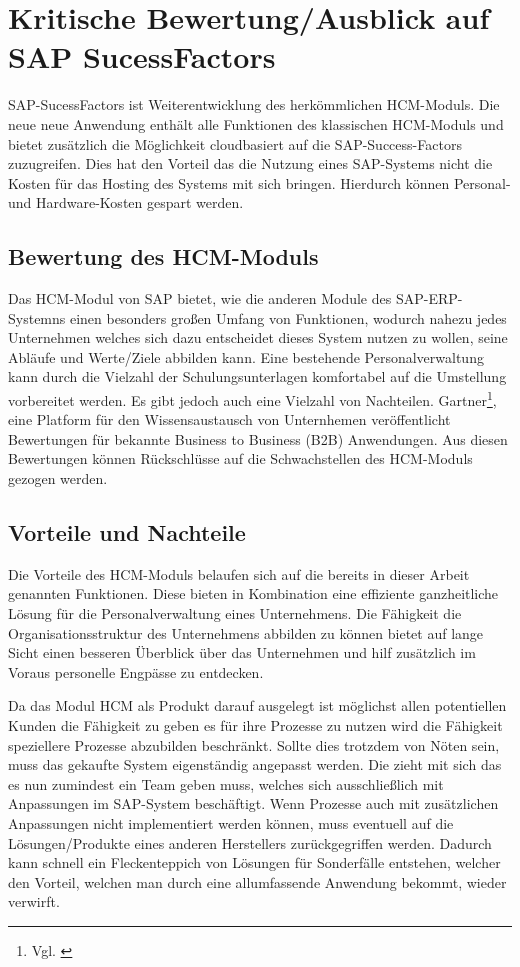 
\section{Kritische Bewertung/Ausblick auf SAP SucessFactors} 
\label{sec:bewertungundausblick}

SAP-SucessFactors ist Weiterentwicklung des herkömmlichen HCM-Moduls. Die neue neue Anwendung enthält alle Funktionen des klassischen HCM-Moduls und bietet zusätzlich die Möglichkeit cloudbasiert auf die SAP-Success-Factors zuzugreifen. Dies hat den Vorteil das die Nutzung eines SAP-Systems nicht die Kosten für das Hosting des Systems mit sich bringen. Hierdurch können Personal- und Hardware-Kosten gespart werden. 

\subsection{Bewertung des HCM-Moduls}
Das HCM-Modul von SAP bietet, wie die anderen Module des SAP-ERP-Systemns einen besonders großen Umfang von Funktionen, wodurch nahezu jedes Unternehmen welches sich dazu entscheidet dieses System nutzen zu wollen, seine Abläufe und Werte/Ziele abbilden kann. Eine bestehende Personalverwaltung kann durch die Vielzahl der Schulungsunterlagen komfortabel auf die Umstellung vorbereitet werden. Es gibt jedoch auch eine Vielzahl von Nachteilen. Gartner\footnote{Vgl. \cite{Gartner2024}}, eine Platform für den Wissensaustausch von Unternhemen veröffentlicht Bewertungen für bekannte Business to Business (B2B) Anwendungen. Aus diesen Bewertungen können Rückschlüsse auf die Schwachstellen des HCM-Moduls gezogen werden. 

\subsection{Vorteile und Nachteile}
Die Vorteile des HCM-Moduls belaufen sich auf die bereits in dieser Arbeit genannten Funktionen. Diese bieten in Kombination eine effiziente ganzheitliche Lösung für die Personalverwaltung eines Unternehmens. Die Fähigkeit die Organisationsstruktur des Unternehmens abbilden zu können bietet auf lange Sicht einen besseren Überblick über das Unternehmen und hilf zusätzlich im Voraus personelle Engpässe zu entdecken. 

Da das Modul HCM als Produkt darauf ausgelegt ist möglichst allen potentiellen Kunden die Fähigkeit zu geben es für ihre Prozesse zu nutzen wird die Fähigkeit speziellere Prozesse abzubilden beschränkt. Sollte dies trotzdem von Nöten sein, muss das gekaufte System eigenständig angepasst werden. Die zieht mit sich das es nun zumindest ein Team geben muss, welches sich ausschließlich mit Anpassungen im SAP-System beschäftigt. Wenn Prozesse auch mit zusätzlichen Anpassungen nicht implementiert werden können, muss eventuell auf die Lösungen/Produkte eines anderen Herstellers zurückgegriffen werden. Dadurch kann schnell ein Fleckenteppich von Lösungen für Sonderfälle entstehen, welcher den Vorteil, welchen man durch eine allumfassende Anwendung bekommt, wieder verwirft. 

